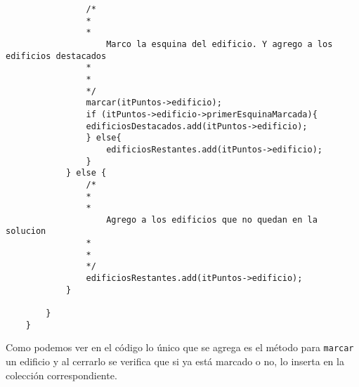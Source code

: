\begin{lstlisting}
				/*
 				*
 				*
 					Marco la esquina del edificio. Y agrego a los edificios destacados
 				*
 				*
 				*/
				marcar(itPuntos->edificio);
				if (itPuntos->edificio->primerEsquinaMarcada){
				edificiosDestacados.add(itPuntos->edificio);
				} else{
					edificiosRestantes.add(itPuntos->edificio);
				}
			} else {
				/*
 				*
 				*
 					Agrego a los edificios que no quedan en la solucion
 				*
 				*
 				*/
				edificiosRestantes.add(itPuntos->edificio);
			}

		}
	}
\end{lstlisting}


Como podemos ver en el código lo único que se agrega es el método para \texttt{marcar} un edificio y al cerrarlo se verifica que si ya está marcado o no, lo inserta en la colección correspondiente.